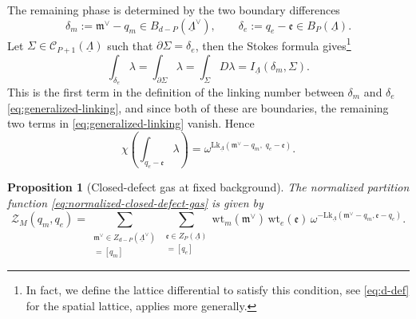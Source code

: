 \documentclass[dvipsnames,a4paper]{article}
\numberwithin{equation}{section}
\newtheorem{prop}[theorem]{Proposition}
\theoremstyle{definition}
\theoremstyle{remark}
\newcommand{\Lk}{\mathrm{Lk}}
\newcommand{\wt}{\mathrm{wt}}
\begin{document}
The remaining phase is determined by the two boundary differences
\begin{equation}
\delta_m:=\mathfrak m^\vee-q_m\in B_{d-P}(\underline\Lambda^\vee),
\qquad
\delta_e:=q_e-\mathfrak e\in B_P(\underline\Lambda).
\end{equation}
Let \(\Sigma\in \mathcal C_{P+1}(\underline\Lambda)\)
such that \(\partial\Sigma=\delta_e\), then the Stokes formula gives\footnote{In fact, we define the lattice differential to satisfy this condition, see \eqref{eq:d-def} for the spatial lattice, applies more generally.}
\begin{equation}
\int_{\delta_e}\lambda
=
\int_{\partial\Sigma}\lambda
=
\int_\Sigma D\lambda
=
I_{\underline\Lambda}(\delta_m,\Sigma).
\end{equation}
This is the first term in the definition of the linking number between $\delta_m$ and $\delta_e$ \eqref{eq:generalized-linking}, and since both of these are boundaries, the remaining two terms in \eqref{eq:generalized-linking} vanish. Hence
\begin{equation}
	\chi \left(\int_{q_e-\mathfrak e}\lambda\right)
	=
	\omega^{
		\Lk_{\underline\Lambda}
		(\mathfrak m^\vee-q_m,\;q_e-\mathfrak e)
	}.
	\label{eq:Xi-linking-phase}
\end{equation}

\begin{prop}[Closed-defect gas at fixed background]
	\label{prop:closed-defect-gas-fixed-charge}
	The normalized partition function \eqref{eq:normalized-closed-defect-gas} is given by
	\begin{equation}
		\mathcal Z_M(q_m,q_e)
		=
		\sum_{\substack{\mathfrak m^\vee\in Z_{d-P}(\underline\Lambda^\vee)\\
				[\mathfrak m^\vee]=[q_m]}}
		\sum_{\substack{\mathfrak e\in Z_P(\underline\Lambda)\\
				[\mathfrak e]=[q_e]}}
		\wt_m(\mathfrak m^\vee)\,
		\wt_e(\mathfrak e)\,
		\omega^{-
			\Lk_{\underline\Lambda}
			(\mathfrak m^\vee-q_m,\mathfrak e-q_e)
		}.
		\label{eq:closed-defect-gas-fixed-charge}
	\end{equation}
\end{prop}
\end{document}
